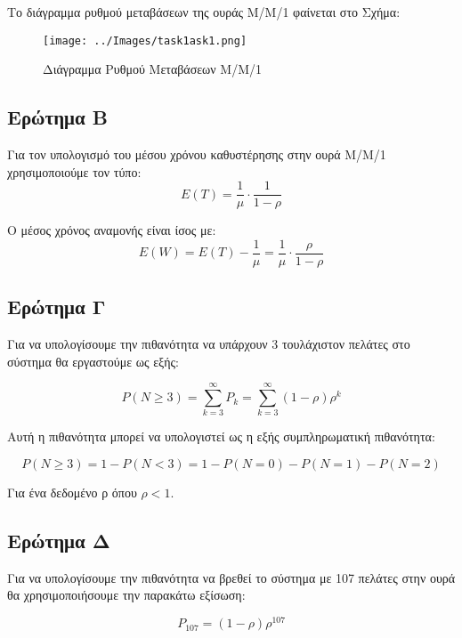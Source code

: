 \documentclass[12pt]{article}
\begin{document}
Το διάγραμμα ρυθμού μεταβάσεων της ουράς Μ/Μ/1 φαίνεται στο Σχήμα: 

\begin{figure}[H]
    \centering
    \texttt{[image: ../Images/task1ask1.png]}
    \caption{Διάγραμμα Ρυθμού Μεταβάσεων Μ/Μ/1}
    \label{fig:task1ask1}
\end{figure}

\subsection{Ερώτημα Β}

Για τον υπολογισμό του μέσου χρόνου καθυστέρησης στην ουρά Μ/Μ/1 χρησιμοποιούμε τον τύπο:
\begin{equation}
    Ε(Τ) = \frac{1}{\mu} \cdot \frac{1}{1-\rho}
\end{equation}

Ο μέσος χρόνος αναμονής είναι ίσος με:
\begin{equation}
    Ε(W) = Ε(T) - \frac{1}{\mu} = \frac{1}{\mu} \cdot \frac{\rho}{1-\rho}
\end{equation}

\subsection{Ερώτημα Γ}
Για να υπολογίσουμε την πιθανότητα να υπάρχουν 3 τουλάχιστον πελάτες στο σύστημα θα 
εργαστούμε ως εξής: 

\begin{equation}
    P(N \ge 3) = \sum_{k=3}^{\infty} P_k = \sum_{k=3}^{\infty} (1-\rho)\rho^k
\end{equation}

Αυτή η πιθανότητα μπορεί να υπολογιστεί ως η εξής συμπληρωματική πιθανότητα: 

\begin{equation}
    P(N \ge 3) = 1 - P(N < 3) = 1 - P(N = 0) - P(N = 1) - P(N = 2)
\end{equation}

Για ένα δεδομένο ρ όπου $\rho < 1$.

\subsection{Ερώτημα Δ}
Για να υπολογίσουμε την πιθανότητα να βρεθεί το σύστημα με 107 πελάτες στην ουρά θα 
χρησιμοποιήσουμε την παρακάτω εξίσωση:

\begin{equation}
    P_{107} = (1-\rho)\rho^{107}
\end{equation}
\end{document}
